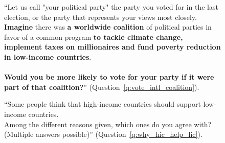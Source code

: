 \begin{figure}[h!]
    \caption[Would vote for a party in a global coalition for sustainable development]{``Let us call "your political party" the party you voted for in the last election, or the party that represents your views most closely.~\\\textbf{Imagine }there was \textbf{a worldwide coalition} of political parties in favor of a common program \textbf{to tackle climate change, implement taxes on millionaires and fund poverty reduction in low-income countries}.~\\\\\textbf{Would you be more likely to vote for your party if it were part of that coalition?}'' (Question~\ref{q:vote_intl_coalition}).
    }\label{fig:vote_intl_coalition}
\end{figure}

\begin{figure}[h!]
    \caption[Agreement with rationales for global redistribution]{``Some people think that high-income countries should support low-income countries.~\\Among the different reasons given, which ones do you agree with? (Multiple answers possible)'' (Question~\ref{q:why_hic_help_lic}).
    }\label{fig:why_hic_help_lic}
\end{figure}

